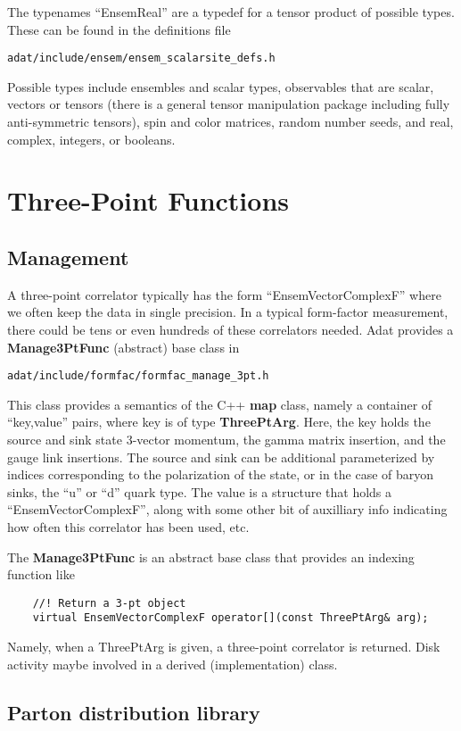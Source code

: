 \documentclass[11pt]{article}
\begin{document}
The typenames ``EnsemReal'' are a typedef for a tensor product of possible
types. These can be found in the definitions file
\begin{verbatim}
adat/include/ensem/ensem_scalarsite_defs.h
\end{verbatim}
Possible types include ensembles and scalar types, observables that are
scalar, vectors or tensors (there is a general tensor manipulation package
including fully anti-symmetric tensors), spin and color matrices, random
number seeds, and real, complex, integers, or booleans.

\section{Three-Point Functions}
\subsection{Management}\label{sec:manage}
A three-point correlator typically has the form
``EnsemVectorComplexF'' where we often keep the data in single
precision. In a typical form-factor measurement, there could be tens
or even hundreds of these correlators needed. Adat provides a {\bf
Manage3PtFunc} (abstract) base class in 
\begin{verbatim}
adat/include/formfac/formfac_manage_3pt.h
\end{verbatim} 
This class provides a
semantics of the C++ {\bf map} class, namely a container of
``key,value'' pairs, where key is of type {\bf ThreePtArg}. Here, the
key holds the source and sink state 3-vector momentum, the gamma
matrix insertion, and the gauge link insertions. The source and sink
can be additional parameterized by indices corresponding to the
polarization of the state, or in the case of baryon sinks, the ``u''
or ``d'' quark type. The value is a structure that holds a
``EnsemVectorComplexF'', along with some other bit of auxilliary info
indicating how often this correlator has been used, etc.

The {\bf Manage3PtFunc} is an abstract base class that provides an 
indexing function like
\begin{verbatim}
    //! Return a 3-pt object
    virtual EnsemVectorComplexF operator[](const ThreePtArg& arg);
\end{verbatim}
Namely, when a ThreePtArg is given, a three-point correlator is returned.
Disk activity maybe involved in a derived (implementation) class.

\subsection{Parton distribution library}
\end{document}

